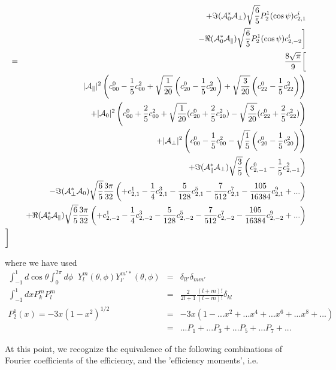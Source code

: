 \documentclass[a4paper,9pt,twoside]{article}
\begin{document}
\begin{eqnarray}
          &&                  +\Im({\cal A}_0^* {\cal A}_\perp )      \sqrt{\frac{6}{5}}P_2^1(\cos\psi)c^i_{2,1} \\
          &&                  -\Re({\cal A}_0^*{\cal A}_\parallel  )  \sqrt{\frac{6}{5}}P_2^1(\cos\psi) c^i_{2,-2} 
      \biggr] \\
      &=& \frac{8\sqrt{\pi}}{9}  \biggl[ \\
         &&                    |{\cal A}_\parallel|^2 \left( c^0_{00}-\frac{1}{5}c^2_{00}+\sqrt{\frac{1}{20}}\left(c^0_{20}-\frac{1}{5}c^2_{20}\right)+\sqrt{\frac{3}{20}}\left(c^0_{22}-\frac{1}{5}c^2_{22}\right)  \right)  \\
         &&                   +|{\cal A}_0|^2   \left( c^0_{00}+\frac{2}{5}c^2_{00}+\sqrt{\frac{1}{20}}(c^0_{20}+\frac{2}{5}c^2_{20})-\sqrt{\frac{3}{20}}(c^0_{22}+\frac{2}{5}c^2_{22}) \right) \\
         &&                   +|{\cal A}_\perp|^2    \left( c^0_{00}-\frac{1}{5}c^2_{00} - \sqrt{\frac{1}{5}}\left(c^0_{20}-\frac{1}{5}c^2_{20}\right)\right)\\
         &&                   +\Im({\cal A}_\parallel^*{\cal A}_\perp)\sqrt{\frac{3}{5}}\left(c^0_{2,-1}-\frac{1}{5}c^2_{2,-1}\right)  \\
         &&                   -\Im({\cal A}_\perp^* {\cal A}_0 )  \sqrt{\frac{6}{5}}\frac{3\pi}{32}\left( +c^1_{2,1} -\frac{1}{4}c^3_{2,1}- \frac{5}{128}c^5_{2,1} -\frac{7}{512}c^7_{2,1} - \frac{105}{16384}c^9_{2,1}+... \right) \\
         &&                   +\Re({\cal A}_0^*{\cal A}_\parallel)\sqrt{\frac{6}{5}}\frac{3\pi}{32}\left( +c^1_{2,-2}-\frac{1}{4}c^3_{2,-2}-\frac{5}{128}c^5_{2,-2}-\frac{7}{512}c^7_{2,-2} - \frac{105}{16384}c^9_{2,-2}+... \right) \\
      \biggr]
\end{eqnarray}

where we have used 
\begin{eqnarray}
\int_{-1}^1 d\cos\theta \int_0^{2\pi} d\phi \;\;Y_l^m(\theta,\phi) Y_{l'}^{m'*}(\theta,\phi) &=& \delta_{ll'}\delta_{mm'}\\
\int_{-1}^1 dx  P_k^m P_l^m&=& \frac{2}{2l+1}\frac{(l+m)!}{(l-m)!}\delta_{kl} \\
P_2^1(x) = -3x(1-x^2)^{1/2} &=& -3x(1-...  x^2 + ... x^4  + ...x^6 + ...x^8  + ... ) \\
&=& ...P_1 + ...P_3 + ...P_5 +...P_7 + ...
\end{eqnarray}

At this point, we recognize the equivalence of the following combinations of Fourier coefficients of the efficiency, and the 'efficiency moments',
i.e.
\end{document}
